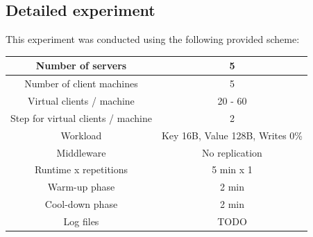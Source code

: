 \documentclass[11pt]{article}
\begin{document}
\subsection{Detailed experiment}

This experiment was conducted using the following provided scheme:
\medskip

\small{
\smallskip
\begin{tabular}{|c|c|}
\hline Number of servers & 5 \\ 
\hline Number of client machines & 5 \\ 
\hline Virtual clients / machine &  20 - 60 \\ 
\hline Step for virtual clients / machine & 2 \\
\hline Workload & Key 16B, Value 128B, Writes 0\% \\
\hline Middleware & No replication \\ 
\hline Runtime x repetitions & 5 min x 1 \\ 
\hline Warm-up phase & 2 min \\
\hline Cool-down phase & 2 min \\
\hline Log files & TODO \\
\hline 
\end{tabular} }
\medskip
\end{document}
